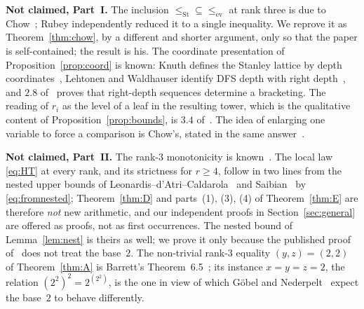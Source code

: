 \documentclass[11pt,a4paper]{article}
\theoremstyle{plain}
\theoremstyle{definition}
\newcommand{\ev}{\mathrm{ev}}
\newcommand{\St}{\mathrm{St}}
\begin{document}
\medskip
\noindent\textbf{Not claimed, Part~I.} The inclusion $\le_{\St}\subseteq\le_{\ev}$ at
rank three is due to Chow~\cite{MO}; Rubey independently reduced it to a single
inequality. We reprove it as
Theorem~\ref{thm:chow}, by a different and shorter argument, only so that the paper is
self-contained; the result is his. The coordinate presentation of
Proposition~\ref{prop:coord} is known: Knuth defines the Stanley lattice by depth
coordinates~\cite{Knuth}, Lehtonen and Waldhauser identify DFS depth with right
depth~\cite{LW}, and $2.8$ of~\cite{CsW} proves that right-depth sequences determine a
bracketing. The reading of $r_i$ as the level of a leaf in the resulting tower, which is
the qualitative content of Proposition~\ref{prop:bounds}, is $3.4$ of~\cite{CsW}. The
idea of enlarging one variable to force a comparison is Chow's, stated in the same
answer~\cite{MO}.

\medskip
\noindent\textbf{Not claimed, Part~II.} The rank-$3$ monotonicity is known~\cite{MO}.
The local law \eqref{eq:HT} at every rank, and its strictness for $r\ge4$, follow in two
lines from the nested upper bounds of Leonardis--d'Atri--Caldarola~\cite{LdC} and
Saibian~\cite{Sai} by \eqref{eq:fromnested}; Theorem~\ref{thm:D} and parts~(1), (3), (4)
of Theorem~\ref{thm:E} are therefore \emph{not} new arithmetic, and our independent
proofs in Section~\ref{sec:general} are offered as proofs, not as first occurrences.
The nested bound of Lemma~\ref{lem:nest} is theirs as well; we prove it only because the
published proof of~\cite[Lemma~4.8]{LdC} does not treat the base~$2$. The non-trivial
rank-$3$ equality $(y,z)=(2,2)$ of Theorem~\ref{thm:A} is Barrett's
Theorem~6.5~\cite{Bar}; its instance $x=y=z=2$, the relation $(2^2)^2=2^{(2^2)}$, is the
one in view of which G\"obel and Nederpelt~\cite{GN} expect the base~$2$ to behave
differently.
\end{document}
